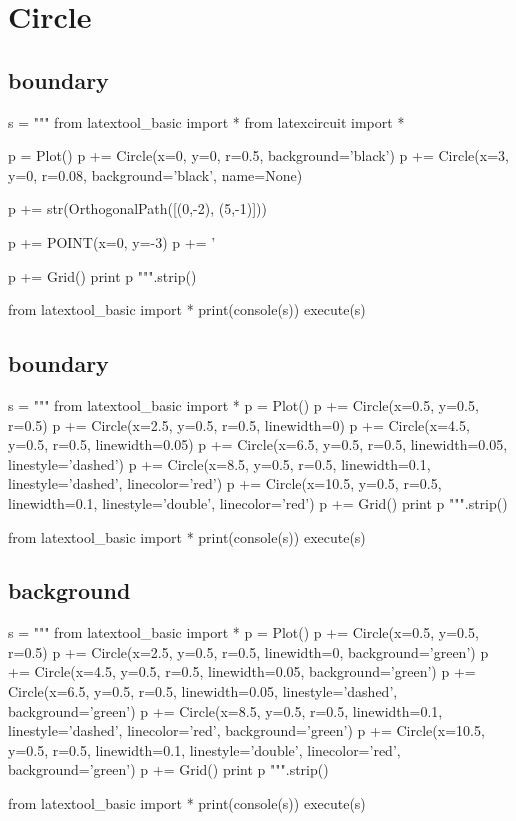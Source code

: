 \section{Circle}

\subsection{boundary}
\begin{python}
s = """
from latextool_basic import *
from latexcircuit import *

p = Plot()
p += Circle(x=0, y=0, r=0.5, background='black')
p += Circle(x=3, y=0, r=0.08, background='black', name=None)


p += str(OrthogonalPath([(0,-2), (5,-1)]))

p += POINT(x=0, y=-3)
p += '%

p += Grid()
print p
""".strip()

from latextool_basic import *
print(console(s))
execute(s)
\end{python}




\subsection{boundary}
\begin{python}
s = """
from latextool_basic import *
p = Plot()
p += Circle(x=0.5, y=0.5, r=0.5)
p += Circle(x=2.5, y=0.5, r=0.5, linewidth=0)
p += Circle(x=4.5, y=0.5, r=0.5, linewidth=0.05)
p += Circle(x=6.5, y=0.5, r=0.5, linewidth=0.05, linestyle='dashed')
p += Circle(x=8.5, y=0.5, r=0.5, linewidth=0.1, linestyle='dashed', 
                                 linecolor='red')
p += Circle(x=10.5, y=0.5, r=0.5, linewidth=0.1, linestyle='double', 
                                 linecolor='red')
p += Grid()
print p
""".strip()

from latextool_basic import *
print(console(s))
execute(s)
\end{python}


\newpage
\subsection{background}
\begin{python}
s = """
from latextool_basic import *
p = Plot()
p += Circle(x=0.5, y=0.5, r=0.5)
p += Circle(x=2.5, y=0.5, r=0.5, linewidth=0, background='green')
p += Circle(x=4.5, y=0.5, r=0.5, linewidth=0.05, background='green')
p += Circle(x=6.5, y=0.5, r=0.5, linewidth=0.05, linestyle='dashed',
                                 background='green')
p += Circle(x=8.5, y=0.5, r=0.5, linewidth=0.1, linestyle='dashed', 
                                 linecolor='red', background='green')
p += Circle(x=10.5, y=0.5, r=0.5, linewidth=0.1, linestyle='double', 
                                 linecolor='red', background='green')
p += Grid()
print p
""".strip()

from latextool_basic import *
print(console(s))
execute(s)
\end{python}





